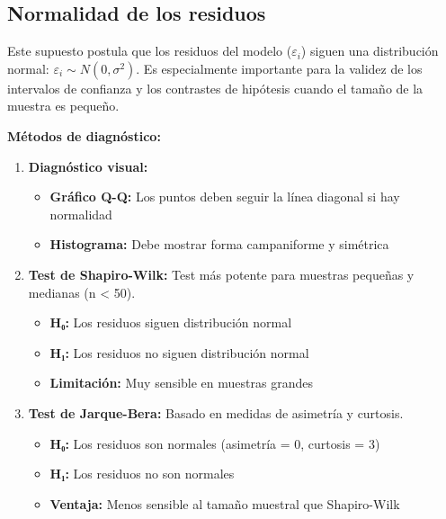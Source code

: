 \documentclass[
  letterpaper,
  DIV=11,
  numbers=noendperiod]{scrreprt}
\providecommand{\tightlist}{%
  \setlength{\itemsep}{0pt}\setlength{\parskip}{0pt}}
\begin{document}
\subsection{Normalidad de los
residuos}\label{normalidad-de-los-residuos}

Este supuesto postula que los residuos del modelo (\(\varepsilon_i\))
siguen una distribución normal: \(\varepsilon_i \sim N(0, \sigma^2)\).
Es especialmente importante para la validez de los intervalos de
confianza y los contrastes de hipótesis cuando el tamaño de la muestra
es pequeño.

\textbf{Métodos de diagnóstico:}

\begin{enumerate}
\def\labelenumi{\arabic{enumi}.}
\item
  \textbf{Diagnóstico visual:}

  \begin{itemize}
  \tightlist
  \item
    \textbf{Gráfico Q-Q:} Los puntos deben seguir la línea diagonal si
    hay normalidad
  \item
    \textbf{Histograma:} Debe mostrar forma campaniforme y simétrica
  \end{itemize}
\item
  \textbf{Test de Shapiro-Wilk:} Test más potente para muestras pequeñas
  y medianas (n \textless{} 50).

  \begin{itemize}
  \tightlist
  \item
    \textbf{H₀:} Los residuos siguen distribución normal
  \item
    \textbf{H₁:} Los residuos no siguen distribución normal
  \item
    \textbf{Limitación:} Muy sensible en muestras grandes
  \end{itemize}
\item
  \textbf{Test de Jarque-Bera:} Basado en medidas de asimetría y
  curtosis.

  \begin{itemize}
  \tightlist
  \item
    \textbf{H₀:} Los residuos son normales (asimetría = 0, curtosis = 3)
  \item
    \textbf{H₁:} Los residuos no son normales
  \item
    \textbf{Ventaja:} Menos sensible al tamaño muestral que Shapiro-Wilk
  \end{itemize}
\end{enumerate}
\end{document}
